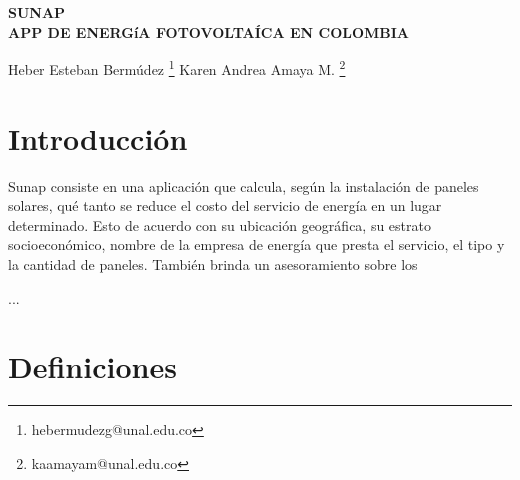 \documentclass[11pt,twoside]{article}
\date{}
\begin{document}
	
	{
		\fancyhead[L]{}
		\fancyfoot[LO,RE]{}
		\fancyfoot[LE,RO]{ \vspace{10pt}\thepage}
		\renewcommand{\headrulewidth}{0pt}
		\renewcommand{\footrulewidth}{0pt}
	}
	
	\thispagestyle{firststyle}
	\begin{center}
		\Large{{\bf SUNAP\\
				\vspace{20pt}   APP DE ENERGíA FOTOVOLTAÍCA EN COLOMBIA\\ 
				\vspace{10pt}}}
	\end{center}
	
	\begin{center}
	Heber Esteban Bermúdez			\footnote{\footnotesize{ hebermudezg@unal.edu.co}}
	Karen Andrea Amaya M.	\footnote{\footnotesize{kaamayam@unal.edu.co}}
	
	\end{center}
			
	
	
	
	
	
	\begin{abstract}
	
	\end{abstract}
	
	
	
	\section{Introducción}
Sunap consiste en una aplicación que calcula, según la instalación de paneles solares, qué tanto se reduce el costo del servicio de energía en un lugar determinado. Esto de acuerdo con su ubicación geográfica, su estrato socioeconómico, nombre de la empresa de energía que presta el servicio, el tipo y la cantidad de paneles. También brinda un asesoramiento sobre los

... 



	\section{Definiciones}
\end{document}
